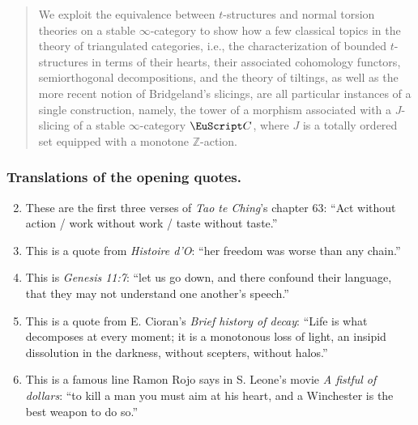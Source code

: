 \documentclass[a4paper,10pt]{amsart}
\begin{document}


\begin{abstract}
We exploit the equivalence between $t$-structures and normal torsion theories on a stable $\infty$-category to show how a few classical topics in the theory of triangulated categories, i.e., the characterization of bounded $t$-structures in terms of their hearts, their associated cohomology functors, semiorthogonal decompositions, and the theory of tiltings, as well as the more recent notion of Bridgeland's slicings, are all particular instances of a single construction, namely, the tower of a morphism associated with a $J$-slicing of a stable $\infty$-category $\C$, where $J$ is a totally ordered set equipped with a monotone $\mathbb{Z}$-action. 
\end{abstract}

\tableofcontents

\newpage 











\hrulefill
\subsubsection*{Translations of the opening quotes.}
\begin{enumerate}[label=\S\arabic*.)]
 \setcounter{enumi}{1}
 \item These are the first three verses of \emph{Tao te Ching}'s chapter 63: ``Act without action / work without work / taste without taste.''
 \item This is a quote from \emph{Histoire d'O}: ``her freedom was worse than any chain.''
 \item This is \emph{Genesis 11:7}: ``let us go down, and there confound their language, that they may not understand one another's speech.''
 \setcounter{enumi}{5}
 \item This is a quote from E. Cioran's \emph{Brief history of decay}: ``Life is what decomposes at every moment; it is a monotonous loss of light, an insipid dissolution in the darkness, without scepters, without halos.''
 \item This is a famous line Ramon Rojo says in S. Leone's movie \emph{A fistful of dollars}: ``to kill a man you must aim at his heart, and a Winchester is the best weapon to do so.''
\end{enumerate}



\end{document}
